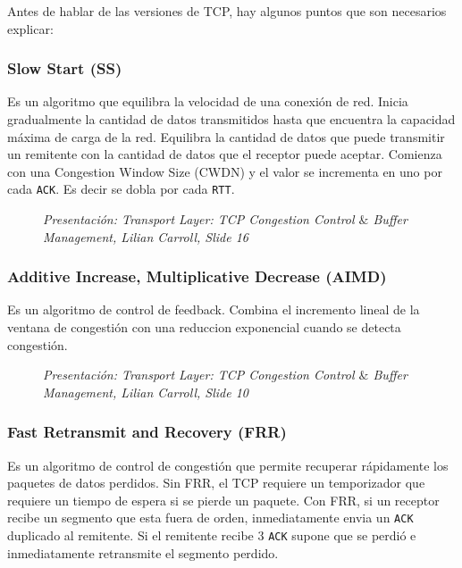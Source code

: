 Antes de hablar de las versiones de TCP, hay algunos puntos que son necesarios explicar:
\subsubsection*{Slow Start (SS)}
Es un algoritmo que equilibra la velocidad de una conexión de red. Inicia gradualmente la cantidad de datos transmitidos hasta que encuentra la capacidad máxima de carga de la red. Equilibra la cantidad de datos que puede transmitir un remitente con la cantidad de datos que el receptor puede aceptar. Comienza con una Congestion Window Size (CWDN) y el valor se incrementa en uno por cada \texttt{ACK}. Es decir se dobla por cada \texttt{RTT}.
       
\begin{figure}[H]
\centering
\caption{\textit{Presentación: Transport Layer: TCP Congestion Control $\&$ Buffer Management, Lilian Carroll, Slide 16}}
\end{figure}

\subsubsection*{Additive Increase, Multiplicative Decrease (AIMD)}
Es un algoritmo de control de feedback. Combina el incremento lineal de la ventana de congestión con una reduccion exponencial cuando se detecta congestión.

\begin{figure}[H]
\centering
\caption{\textit{Presentación: Transport Layer: TCP Congestion Control $\&$ Buffer Management, Lilian Carroll, Slide 10}}
\end{figure}
\subsubsection*{Fast Retransmit and Recovery (FRR)}
Es un algoritmo de control de congestión que permite recuperar rápidamente los paquetes de datos perdidos. Sin FRR, el TCP requiere un temporizador que requiere un tiempo de espera si se pierde un paquete. Con FRR, si un receptor recibe un segmento que esta fuera de orden, inmediatamente envia un \texttt{ACK} duplicado al remitente. Si el remitente recibe 3 \texttt{ACK} supone que se perdió e inmediatamente retransmite el segmento perdido.


